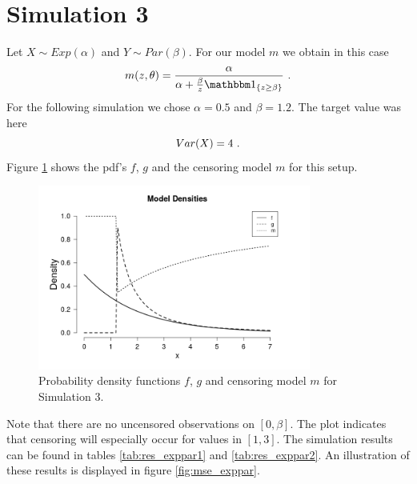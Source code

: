 \section{Simulation 3} \label{sec:sim_exppar}
Let $X \sim Exp(\alpha)$ and $Y \sim Par(\beta)$. For our model $m$ we obtain in this case
$$m(z,\theta) = \frac{\alpha}{\alpha + \frac{\beta}{z}\I{z \geq \beta}}\mdot$$
For the following simulation we chose $\alpha = 0.5$ and $\beta = 1.2$. The target value was here
$$Var(X) = 4\textrm{ .}$$
Figure \ref{fig:dens_exppar} shows the pdf's $f$, $g$ and the censoring model $m$ for this setup.
\clearpage
\begin{figure}[h!]
	\begin{center}
		\includegraphics[width=0.8\textwidth]{./figures/exp_par_dens}
	\end{center}
	\caption{Probability density functions $f$, $g$ and censoring model $m$ for Simulation 3.}
	\label{fig:dens_exppar}
\end{figure}
%
Note that there are no uncensored observations on $[0,\beta]$. The plot indicates that censoring will especially occur for values in $[1,3]$.
%
The simulation results can be found in tables \ref{tab:res_exppar1} and \ref{tab:res_exppar2}. An illustration of these results is displayed in figure \ref{fig:mse_exppar}.

